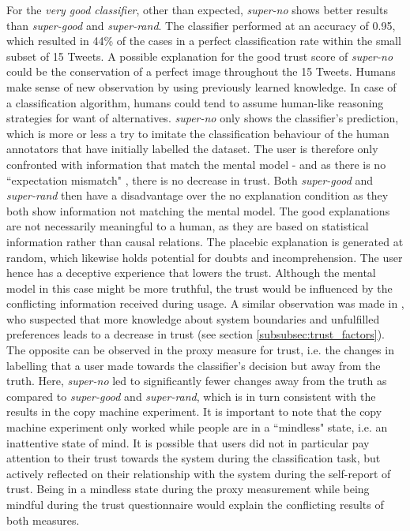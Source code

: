 For the \textit{very good classifier}, other than expected, \textit{super-no} shows better results than \textit{super-good} and \textit{super-rand}. The classifier performed at an accuracy of 0.95, which resulted in 44\% of the cases in a perfect classification rate within the small subset of 15 Tweets. A possible explanation for the good trust score of \textit{super-no} could be the conservation of a perfect image throughout the 15 Tweets. Humans make sense of new observation by using previously learned knowledge. In case of a classification algorithm, humans could tend to assume human-like reasoning strategies for want of alternatives. \textit{super-no} only shows the classifier's prediction, which is more or less a try to imitate the classification behaviour of the human annotators that have initially labelled the dataset. The user is therefore only confronted with information that match the mental model - and as there is no ``expectation mismatch" \cite{glass2008toward}, there is no decrease in trust. Both \textit{super-good} and \textit{super-rand} then have a disadvantage over the no explanation condition as they both show information not matching the mental model. The good explanations are not necessarily meaningful to a human, as they are based on statistical information rather than causal relations. The placebic explanation is generated at random, which likewise holds potential for doubts and incomprehension. The user hence has a deceptive experience that lowers the trust. Although the mental model in this case might be more truthful, the trust would be influenced by the conflicting information received during usage. A similar observation was made in \cite{cramer2008effects}, who suspected that more knowledge about system boundaries and unfulfilled preferences leads to a decrease in trust (see section \ref{subsubsec:trust_factors}). The opposite can be observed in the proxy measure for trust, i.e. the changes in labelling that a user made towards the classifier's decision but away from the truth. Here, \textit{super-no} led to significantly fewer changes away from the truth as compared to \textit{super-good} and \textit{super-rand}, which is in turn consistent with the results in the copy machine experiment. It is important to note that the copy machine experiment only worked while people are in a ``mindless" state, i.e. an inattentive state of mind. It is possible that users did not in particular pay attention to their trust towards the system during the classification task, but actively reflected on their relationship with the system during the self-report of trust. Being in a mindless state during the proxy measurement while being mindful during the trust questionnaire would explain the conflicting results of both measures.\newline

